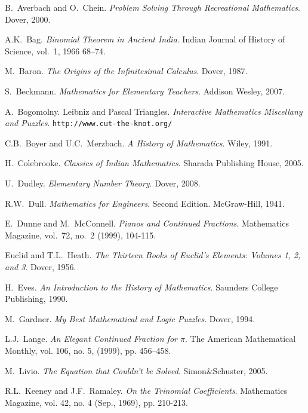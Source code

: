 \begin{thebibliography}{99}

 B.\ Averbach and O.\ Chein. \emph{Problem Solving Through Recreational Mathematics}. Dover, 2000.

 A.K.\ Bag. \emph{Binomial Theorem in Ancient India}. Indian Journal of History of Science, vol.\ 1,  1966 68--74. 

 M.\ Baron. \emph{The Origins of the Infinitesimal Calculus}. Dover, 1987.

 S.\ Beckmann. \emph{Mathematics for Elementary
  Teachers}. Addison Wesley, 2007.

 A.\ Bogomolny. Leibniz and Pascal Triangles. \emph{Interactive Mathematics Miscellany and Puzzles}.
 \texttt{http://www.cut-the-knot.org/}   

 C.B.\ Boyer and U.C.\ Merzbach. \emph{A History of Mathematics}. Wiley, 1991.

 H.\ Colebrooke. \emph{Classics of Indian Mathematics}. 
Sharada Publishing House, 2005.

 U.\ Dudley. \emph{Elementary Number Theory}. Dover,
  2008.

 R.W.\ Dull. \emph{Mathematics for Engineers}. Second
  Edition. McGraw-Hill, 1941.

E.\ Dunne and M.\ McConnell. \emph{Pianos and Continued
Fractions}. Mathematics Magazine, vol.\ 72, no.\ 2 (1999), 104-115.

 Euclid and T.L.\ Heath. \emph{The Thirteen Books of Euclid's Elements: Volumes 1, 2, and 3}. Dover, 1956. 

 H.\ Eves. \emph{An Introduction to the History of Mathematics}. Saunders College Publishing, 1990.

 M.\ Gardner. \emph{My Best Mathematical and Logic
  Puzzles}. Dover, 1994.

 L.J.\ Lange. \emph{An Elegant Continued Fraction for {$\pi$}}. The American Mathematical Monthly, vol. 106, no. 5, (1999), pp. 456--458.

 M.\ Livio. \emph{The Equation that Couldn't be
  Solved}. Simon\&Schuster, 2005.

 R.L.\ Keeney and J.F.\ Ramaley. \emph{On the Trinomial Coefficients}. Mathematics Magazine, vol. 42, no. 4 (Sep., 1969), pp. 210-213.


\end{thebibliography}
